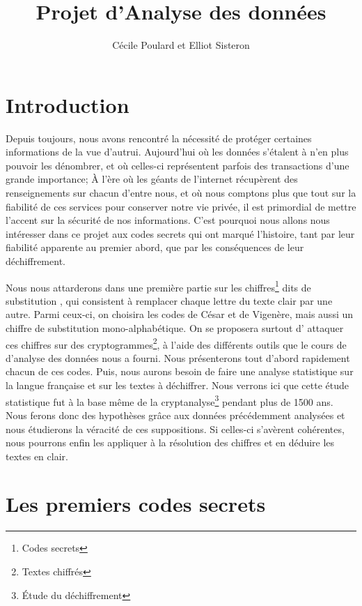 \documentclass[a4paper, titlepage]{livret}
\title{Projet d'Analyse des données}		%
\date{}
\author{Cécile Poulard et Elliot Sisteron}	%
\begin{document}
 
\maketitle{}	%

\setcounter{tocdepth}{1}
\tableofcontents		%

\chapter*{Introduction}
Depuis toujours, nous avons rencontré la nécessité de protéger certaines informations de la vue d'autrui.
Aujourd'hui où les données s'étalent à n'en plus pouvoir les dénombrer, et où celles-ci représentent parfois des transactions d'une grande importance; 
À l'ère où les géants de l'internet récupèrent des renseignements sur chacun d'entre nous, et où nous comptons plus que tout sur la fiabilité de ces services pour conserver notre vie privée,  il est primordial de mettre l'accent sur la sécurité de nos informations.
C'est pourquoi nous allons nous intéresser dans ce projet aux codes secrets qui ont marqué l'histoire, tant par leur fiabilité apparente au premier abord, que par les conséquences de leur déchiffrement.

Nous nous attarderons dans une première partie sur les chiffres\footnote{Codes secrets} dits de \og substitution \fg{}, qui consistent à remplacer chaque lettre du texte clair par une autre.
Parmi ceux-ci, on choisira les codes de César et de Vigenère, mais aussi un chiffre de substitution mono-alphabétique.
On se proposera surtout d' \og attaquer \fg{} ces chiffres sur des cryptogrammes\footnote{Textes chiffrés}, à l'aide des différents outils que le cours de d'analyse des données nous a fourni.
Nous présenterons tout d'abord rapidement chacun de ces codes.
Puis, nous aurons besoin de faire une analyse statistique sur la langue française et sur les textes à déchiffrer.
Nous verrons ici que cette étude statistique fut à la base même de la cryptanalyse\footnote{Étude du déchiffrement} pendant plus de 1500 ans. 
Nous ferons donc des hypothèses grâce aux données précédemment analysées et nous étudierons la véracité de ces suppositions. 
Si celles-ci s'avèrent cohérentes, nous pourrons enfin les appliquer à la résolution des chiffres et en déduire les textes en clair.

\chapter{Les premiers codes secrets}
\end{document}
